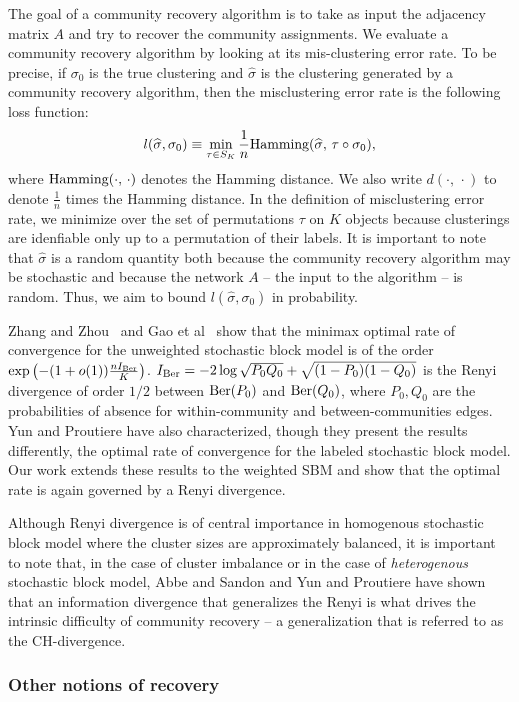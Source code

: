 \documentclass{article}
\begin{document}
The goal of a community recovery algorithm is to take as input the adjacency matrix $A$ and try to recover the community assignments. We evaluate a community recovery algorithm by looking at its mis-clustering error rate. To be precise, if $\sigma_0$ is the true clustering and $\hat{\sigma}$ is the clustering generated by a community recovery algorithm, then the misclustering error rate is the following loss function:
\[
l(\widehat{\sigma}, \sigma_0) \equiv \min_{\tau \in S_K} \frac{1}{n} \textrm{Hamming}(\widehat{\sigma},\, \tau \circ \sigma_0 ),
\]
where $\textrm{Hamming}(\cdot, \, \cdot)$ denotes the Hamming distance. We also write $d(\cdot, \, \cdot)$ to denote $\frac{1}{n}$ times the Hamming distance. In the definition of misclustering error rate, we minimize over the set of permutations $\tau$ on $K$ objects because clusterings are idenfiable only up to a permutation of their labels. It is important to note that $\hat{\sigma}$ is a random quantity both because the community recovery algorithm may be stochastic and because the network $A$ -- the input to the algorithm -- is random. Thus, we aim to bound $l(\hat{\sigma}, \sigma_0)$ in probability. 

Zhang and Zhou~\cite{zhangminimax} and Gao et al~\cite{GaoEtal15} show that the minimax optimal rate of convergence for the unweighted stochastic block model is of the order $\exp\left( - (1 + o(1)) \frac{n I_{\textrm{Ber}}}{K} \right)$. $I_{\textrm{Ber}} = -2 \log \sqrt{P_0 Q_0} + \sqrt{(1-P_0)(1-Q_0)}$ is the Renyi divergence of order $1/2$ between $\textrm{Ber}(P_0)$ and $\textrm{Ber}(Q_0)$, where $P_0, Q_0$ are the probabilities of absence for within-community and between-communities edges. Yun and Proutiere have also characterized, though they present the results differently, the optimal rate of convergence for the labeled stochastic block model. Our work extends these results to the weighted SBM and show that the optimal rate is again governed by a Renyi divergence.

Although Renyi divergence is of central importance in homogenous stochastic block model where the cluster sizes are approximately balanced, it is important to note that, in the case of cluster imbalance or in the case of \emph{heterogenous} stochastic block model, Abbe and Sandon \cite{AbbSan15} and Yun and Proutiere \cite{yun2016optimal} have shown that an information divergence that generalizes the Renyi is what drives the intrinsic difficulty of community recovery -- a generalization that is referred to as the CH-divergence.


\subsubsection{Other notions of recovery}
\end{document}
